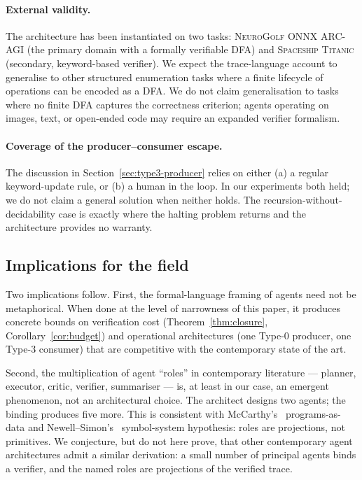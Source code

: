 \paragraph{External validity.}
The architecture has been instantiated on two tasks:
\textsc{NeuroGolf ONNX ARC-AGI} (the primary domain with a
formally verifiable DFA) and \textsc{Spaceship Titanic}
(secondary, keyword-based verifier).  We expect the
trace-language account to generalise to other structured
enumeration tasks where a finite lifecycle of operations can be
encoded as a DFA.  We do not claim generalisation to tasks
where no finite DFA captures the correctness criterion; agents
operating on images, text, or open-ended code may require an
expanded verifier formalism.

\paragraph{Coverage of the producer--consumer escape.}
The discussion in Section~\ref{sec:type3-producer} relies on
either (a) a regular keyword-update rule, or (b) a human in the
loop.  In our experiments both held; we do not claim a general
solution when neither holds.  The recursion-without-decidability
case is exactly where the halting problem returns and the
architecture provides no warranty.

\subsection{Implications for the field}

Two implications follow.  First, the formal-language framing of
agents need not be metaphorical.  When done at the level of
narrowness of this paper, it produces concrete bounds on
verification cost (Theorem~\ref{thm:closure},
Corollary~\ref{cor:budget}) and operational architectures (one
Type-0 producer, one Type-3 consumer) that are competitive with
the contemporary state of the art.

Second, the multiplication of agent ``roles'' in contemporary
literature --- planner, executor, critic, verifier, summariser
--- is, at least in our case, an emergent phenomenon, not an
architectural choice.  The architect designs two agents; the
binding produces five more.  This is consistent with
McCarthy's~\cite{mccarthy1960lisp} programs-as-data and
Newell--Simon's~\cite{newell1976physical} symbol-system
hypothesis: roles are projections, not primitives.  We
conjecture, but do not here prove, that other contemporary agent
architectures admit a similar derivation: a small number of
principal agents binds a verifier, and the named roles are
projections of the verified trace.


